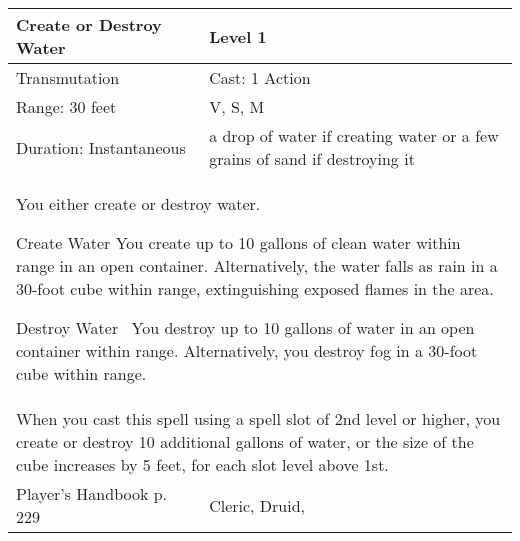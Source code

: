 \documentclass[11pt]{report}
\begin{document}
\begin{table}[H]
	\begin{tabular}{||p{6cm}|p{6cm}||}
		\hline\hline
		\bf{Create or Destroy Water} & Level 1\\ \hline
		Transmutation & Cast: 1 Action\\ \hline
		Range: 30 feet & V, S, M \\ \hline
		Duration: Instantaneous & a drop of water if creating water or a few grains of sand if destroying it\\ \hline
		\multicolumn{2}{||p{12cm}||}{You either create or destroy water. 

Create Water 
You create up to 10 gallons of clean water within range in an open container. Alternatively, the water falls as rain in a 30-foot cube within range, extinguishing exposed flames in the area. 

Destroy Water 
You destroy up to 10 gallons of water in an open container within range. Alternatively, you destroy fog in a 30-foot cube within range.}\\ \hline
		\multicolumn{2}{||p{12cm}||}{When you cast this spell using a spell slot of 2nd level or higher, you create or destroy 10 additional gallons of water, or the size of the cube increases by 5 feet, for each slot level above 1st.}\\ \hline
Player's Handbook p. 229 & Cleric, Druid, \\ \hline\hline
	\end{tabular}
\end{table}
\end{document}
